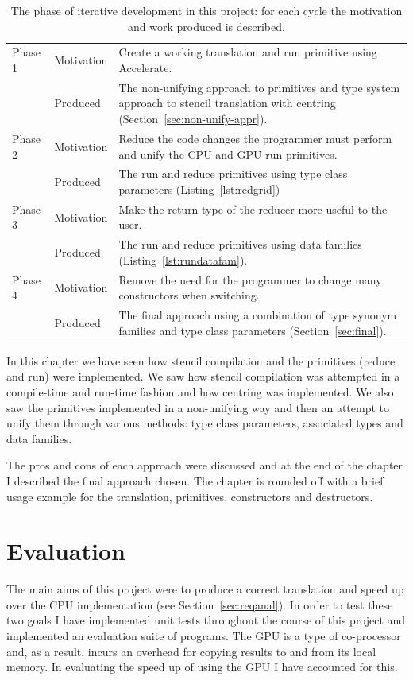 \documentclass[12pt,a4paper,twoside]{scrbook}
\begin{document}
\begin{table}
\begin{tabular}{l l | p{10cm}}
  Phase 1 & Motivation & Create a working translation and run primitive using Accelerate.\\
  & Produced & The non-unifying approach to primitives and type system approach to stencil translation with centring (Section~\ref{sec:non-unify-appr}).
  \\
  Phase 2 & Motivation & Reduce the code changes the programmer must perform and unify the CPU and GPU run primitives.\\
  & Produced & The run and reduce primitives using type class parameters (Listing~\ref{lst:redgrid})
  \\
  Phase 3 & Motivation & Make the return type of the reducer more useful to the user.\\
  & Produced & The run and reduce primitives using data families (Listing~\ref{lst:rundatafam}).
  \\
  Phase 4 & Motivation & Remove the need for the programmer to change many constructors when switching.\\
  & Produced & The final approach using a combination of type synonym families and type class parameters (Section~\ref{sec:final}).
\end{tabular}
\caption{The phase of iterative development in this project: for each cycle the motivation and work produced is described. \label{tbl:iter}}
\end{table}

In this chapter we have seen how stencil compilation and the primitives (reduce
and run) were implemented. We saw how stencil compilation was attempted in a
compile-time and run-time fashion and how centring was implemented. We also saw
the primitives implemented in a non-unifying way and then an attempt to unify
them through various methods: type class parameters, associated types and data
families. 

The pros and cons of each approach were discussed and at the end of the chapter
I described the final approach chosen. The chapter is rounded off with a brief
usage example for the translation, primitives, constructors and destructors.

\chapter{Evaluation}

The main aims of this project were to produce a correct translation and speed up
over the CPU implementation (see Section~\ref{sec:reqanal}). In order to test these two goals I have implemented
unit tests throughout the course of this project and implemented an evaluation
suite of programs. The GPU is a type of co-processor and, as a result, incurs an
overhead for copying results to and from its local memory. In evaluating the
speed up of using the GPU I have accounted for this.
\end{document}
